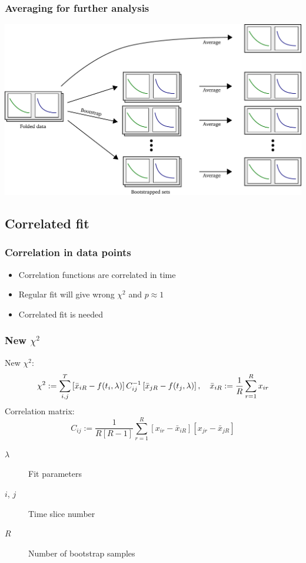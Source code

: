 \documentclass[english, fleqn]{beamer}
\begin{document}
\begin{frame}
    \frametitle{Averaging for further analysis}
    \begin{center}
        \includegraphics[scale=\scale]{sketches/04-bootstrap.pdf}
    \end{center}
\end{frame}

\subsection{Correlated fit}

\begin{frame}
    \frametitle{Correlation in data points}
    \begin{itemize}
        \item
            Correlation functions are correlated in time
        \item
            Regular fit will give wrong $\chi^2$ and $p \approx 1$
        \item
            Correlated fit is needed
    \end{itemize}
\end{frame}

\begin{frame}
    \frametitle{New $\chi^2$}

    New $\chi^2$:
    \[
        \chi^2 := \sum_{i, j}^T
        \left[ \bar x_{iR} - f(t_i, \lambda) \right]
        C^{-1}_{ij}
        \left[ \bar x_{jR} - f(t_j, \lambda) \right]
        ,\quad
        \bar x_{iR} := \frac 1R \sum_{r=1}^R x_{ir}
    \]
    Correlation matrix:
    \[
        C_{ij} := \frac{1}{R[R-1]} \sum_{r=1}^R
        [x_{ir} - \bar x_{iR}] [x_{jr} - \bar x_{jR}]
    \]

    \begin{description}
        \item[$\lambda$] Fit parameters
        \item[$i$, $j$] Time slice number
        \item[$R$] Number of bootstrap samples
    \end{description}
\end{frame}
\end{document}
